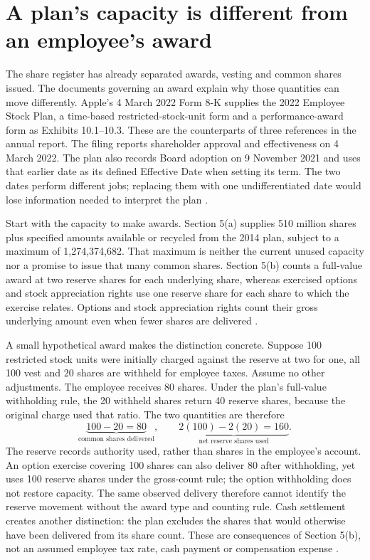 \section{A plan's capacity is different from an employee's award}
\label{sec:apple-stock-plan}

The share register has already separated awards, vesting and common shares
issued. The documents governing an award explain why those quantities can move
differently. Apple's 4 March 2022 Form 8-K supplies the 2022 Employee Stock Plan,
a time-based restricted-stock-unit form and a performance-award form as
Exhibits 10.1--10.3. These are the counterparts of three references in the
annual report. The filing reports shareholder approval and effectiveness on
4 March 2022. The plan also records Board adoption on 9 November 2021 and uses
that earlier date as its defined Effective Date when setting its term. The two
dates perform different jobs; replacing them with one undifferentiated date
would lose information needed to interpret the plan
\citep[Items 5.02 and 5.07; Exhibit 10.1, Sections 1 and 15(a)]{apple2022plan}.

Start with the capacity to make awards. Section 5(a) supplies 510 million
shares plus specified amounts available or recycled from the 2014 plan, subject
to a maximum of 1,274,374,682. That maximum is neither the current unused
capacity nor a promise to issue that many common shares. Section 5(b) counts
a full-value award at two reserve shares for each underlying share, whereas
exercised options and stock appreciation rights use one reserve share for each
share to which the exercise relates. Options and stock appreciation rights
count their gross underlying amount even when fewer shares are delivered
\citep[Exhibit 10.1, Section 5(a)--(b)]{apple2022plan}.

A small hypothetical award makes the distinction concrete. Suppose 100
restricted stock units were initially charged against the reserve at two for
one, all 100 vest and 20 shares are withheld for employee taxes. Assume no
other adjustments. The employee receives 80 shares. Under the plan's
full-value withholding rule, the 20 withheld shares return 40 reserve shares,
because the original charge used that ratio. The two quantities are therefore
\[
 \underbrace{100-20=80}_{\text{common shares delivered}},\qquad
 \underbrace{2(100)-2(20)=160}_{\text{net reserve shares used}}.
\]
The reserve records authority used, rather than shares in the employee's
account. An option exercise covering 100 shares can also deliver 80 after
withholding, yet uses 100 reserve shares under the gross-count rule; the
option withholding does not restore capacity. The same observed delivery
therefore cannot identify the reserve movement without the award type and
counting rule. Cash settlement creates another distinction: the plan excludes
the shares that would otherwise have been delivered from its share count.
These are consequences of Section 5(b), not an assumed employee tax rate,
cash payment or compensation expense \citep[Exhibit 10.1, Section 5(b)]{apple2022plan}.

